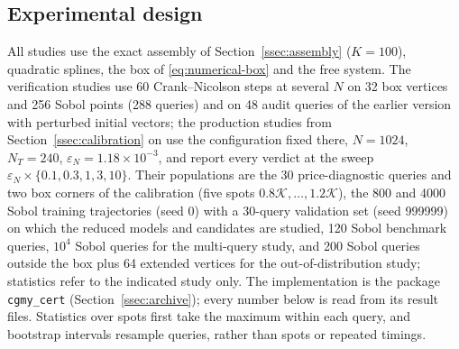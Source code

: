 \documentclass[hidelinks]{siamart251216}
\begin{document}
\subsection{Experimental design}
\label{ssec:design}\label{tab:populations}
All studies use the exact assembly of Section~\ref{ssec:assembly} ($K=100$), quadratic splines,
the box of \eqref{eq:numerical-box} and the free system.  The verification studies use 60
Crank--Nicolson steps at several $N$ on 32 box vertices and 256 Sobol points (288 queries) and on 48
audit queries of the earlier version with perturbed initial vectors; the production studies from
Section~\ref{ssec:calibration} on use the configuration fixed there, $N=1024$, $N_T=240$,
$\varepsilon_N=1.18\times10^{-3}$, and report every verdict at the sweep
$\varepsilon_N\times\{0.1,0.3,1,3,10\}$.  Their populations are the 30 price-diagnostic queries and
two box corners of the calibration (five spots $0.8\mathcal K,\dots,1.2\mathcal K$), the 800 and 4000
Sobol training trajectories (seed 0) with a 30-query validation set (seed 999999) on which the
reduced models and candidates are studied, 120 Sobol benchmark queries, $10^4$ Sobol queries for the
multi-query study, and 200 Sobol queries outside the box plus 64 extended vertices for the
out-of-distribution study; statistics refer to the indicated study only.  The implementation is the
package \texttt{cgmy\_cert} (Section~\ref{ssec:archive}); every number below is read from its result
files.  Statistics over spots first take the maximum within each query, and bootstrap intervals
resample queries, rather than spots or repeated timings.
\end{document}
